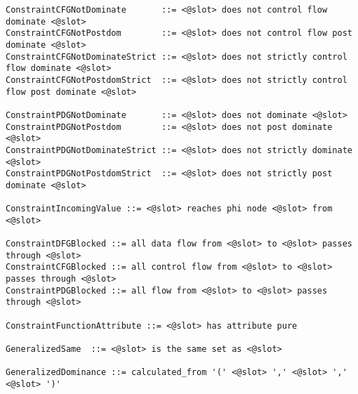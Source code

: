 \begin{lstlisting}[language=BNF,basicstyle=\small\ttfamily,
                   numbers=none,framexleftmargin=0pt,xleftmargin=0pt,]
ConstraintCFGNotDominate       ::= <@slot> does not control flow dominate <@slot>
ConstraintCFGNotPostdom        ::= <@slot> does not control flow post dominate <@slot>
ConstraintCFGNotDominateStrict ::= <@slot> does not strictly control flow dominate <@slot>
ConstraintCFGNotPostdomStrict  ::= <@slot> does not strictly control flow post dominate <@slot>

ConstraintPDGNotDominate       ::= <@slot> does not dominate <@slot>
ConstraintPDGNotPostdom        ::= <@slot> does not post dominate <@slot>
ConstraintPDGNotDominateStrict ::= <@slot> does not strictly dominate <@slot>
ConstraintPDGNotPostdomStrict  ::= <@slot> does not strictly post dominate <@slot>

ConstraintIncomingValue ::= <@slot> reaches phi node <@slot> from <@slot>

ConstraintDFGBlocked ::= all data flow from <@slot> to <@slot> passes through <@slot>
ConstraintCFGBlocked ::= all control flow from <@slot> to <@slot> passes through <@slot>
ConstraintPDGBlocked ::= all flow from <@slot> to <@slot> passes through <@slot>

ConstraintFunctionAttribute ::= <@slot> has attribute pure

GeneralizedSame  ::= <@slot> is the same set as <@slot>

GeneralizedDominance ::= calculated_from '(' <@slot> ',' <@slot> ',' <@slot> ')'
\end{lstlisting}
